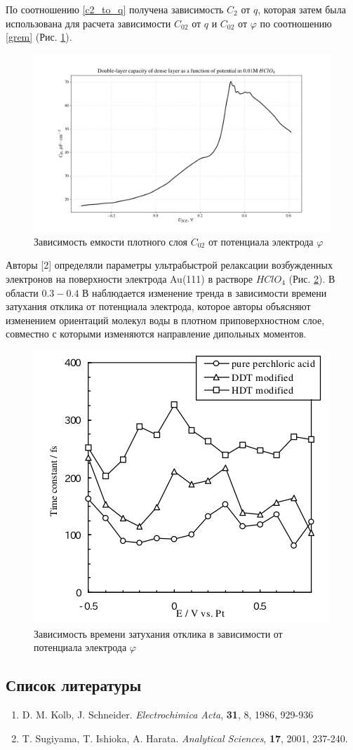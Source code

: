 \documentclass[13pt]{extarticle}
\begin{document}
По соотношению \eqref{c2_to_q} получена зависимость $C_2$ от $q$, которая затем была использована для расчета зависимости $C_{02}$ от $q$ и $C_{02}$ от $\varphi$ по соотношению \eqref{grem} (Рис. \ref{dense}).

\begin{figure}[!ht]
	\includegraphics[width = \linewidth]{../pictures/dense_layer.png}
	\caption{Зависимость емкости плотного слоя $C_{02}$ от потенциала электрода $\varphi$} 
	\label{dense}
\end{figure}

Авторы [2] определяли параметры ультрабыстрой релаксации возбужденных электронов на поверхности электрода Au(111) в растворе $HClO_4$ (Рис. \ref{decay_rate}). В области $0.3-0.4$ В наблюдается изменение тренда в зависимости времени затухания отклика от потенциала электрода, которое авторы объясняют изменением ориентаций молекул воды в плотном приповерхностном слое, совместно с которыми изменяются направление дипольных моментов.  
\begin{figure}[!ht]
	\centering
	\includegraphics[width = 0.5\linewidth]{../pictures/decay_rate.png}
	\caption{Зависимость времени затухания отклика в зависимости от потенциала электрода $\varphi$}
	\label{decay_rate}
\end{figure}

\subsection*{Список литературы}

\begin{enumerate}
	\item D. M. Kolb, J. Schneider. \textit{Electrochimica Acta}, \textbf{31}, 8, 1986, 929-936 
	\item T. Sugiyama, T. Ishioka, A. Harata. \textit{Analytical Sciences}, \textbf{17}, 2001, 237-240.
\end{enumerate}
\end{document}
